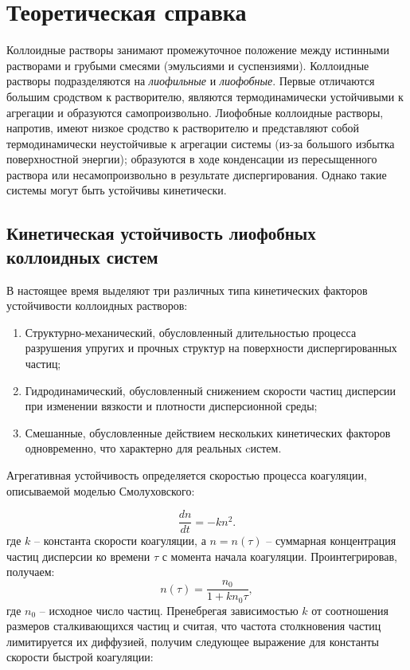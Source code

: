 \documentclass[a4paper,12pt]{article}
\begin{document}
\section{Теоретическая справка}
Коллоидные растворы занимают промежуточное положение между истинными растворами и грубыми смесями (эмульсиями и суспензиями). Коллоидные растворы подразделяются на
\textit{лиофильные} и \textit{лиофобные}. Первые отличаются большим сродством к растворителю, являются термодинамически устойчивыми к агрегации и образуются самопроизвольно. Лиофобные коллоидные растворы, напротив, имеют низкое сродство к растворителю и представляют собой термодинамически неустойчивые к агрегации системы (из-за большого избытка поверхностной энергии); образуются в ходе конденсации из пересыщенного раствора  или несамопроизвольно в результате диспергирования. Однако такие системы могут быть устойчивы кинетически.

\subsection*{Кинетическая устойчивость лиофобных коллоидных систем}
В настоящее время выделяют три различных типа кинетических факторов устойчивости коллоидных растворов:
\begin{enumerate}
    \item Структурно-механический, обусловленный длительностью процесса разрушения упругих и прочных структур на поверхности диспергированных частиц;
    \item Гидродинамический, обусловленный снижением скорости частиц дисперсии при изменении вязкости и плотности дисперсионной среды;
    \item Смешанные, обусловленные действием нескольких кинетических факторов одновременно, что характерно для реальных cистем.
\end{enumerate}
Агрегативная устойчивость определяется скоростью процесса
коагуляции, описываемой моделью Смолуховского: 

\begin{equation}
    \frac{dn}{dt} = -kn^2.
    \label{1}
\end{equation}
где $k$ – константа скорости коагуляции, а $n=n(\tau)$ – суммарная концентрация частиц дисперсии ко времени $\tau$ с момента начала коагуляции.
Проинтегрировав, получаем:
\begin{equation}
    n(\tau) = \frac{n_0}{1+kn_0\tau},
    \label{2}
\end{equation}
где $n_0$ -- исходное число частиц.
Пренебрегая зависимостью $k$ от соотношения размеров сталкивающихся частиц и считая, что частота столкновения частиц лимитируется их диффузией, получим следующее выражение для константы скорости быстрой коагуляции:
\end{document}
